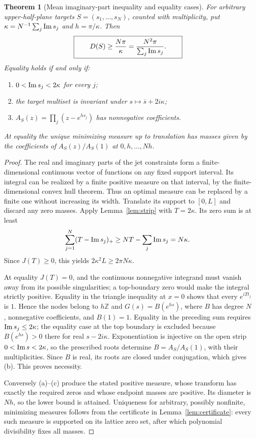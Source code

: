 \documentclass[11pt]{article}
\newtheorem{theorem}{Theorem}[section]
\theoremstyle{remark}\newtheorem{remark}[theorem]{Remark}
\begin{document}
\begin{theorem}[Mean imaginary-part inequality and equality cases]
\label{thm:global}
For arbitrary upper-half-plane targets $S=(s_1,\ldots,s_N)$, counted with
multiplicity, put $\kappa=N^{-1}\sum_j\operatorname{Im} s_j$ and $h=\pi/\kappa$. Then
\begin{equation}\label{eq:global}
 \boxed{\qquad D(S)\ge \frac{N\pi}{\kappa}
       =\frac{N^2\pi}{\sum_j\operatorname{Im} s_j}.\qquad}
\end{equation}
Equality holds if and only if:
\begin{enumerate}[label=(\alph*)]
\item $0<\operatorname{Im} s_j<2\kappa$ for every $j$;
\item the target multiset is invariant under
$s\mapsto\overline{s}+2i\kappa$;
\item $A_S(z)=\prod_j(z-e^{hs_j})$ has nonnegative coefficients.
\end{enumerate}
At equality the unique minimizing measure up to translation has masses
given by the coefficients of $A_S(z)/A_S(1)$ at $0,h,\ldots,Nh$.
\end{theorem}

\begin{proof}
The real and imaginary parts of the jet constraints form a finite-dimensional
continuous vector of functions on any fixed support interval. Its integral
can be realized by a finite positive measure on that interval, by the
finite-dimensional convex hull theorem. Thus an optimal measure can be
replaced by a finite one without increasing its width. Translate its support
to $[0,L]$ and discard any zero masses. Apply Lemma~\ref{lem:strip} with
$T=2\kappa$. Its zero sum is at least
\[
 \sum_{j=1}^N(T-\operatorname{Im} s_j)_+
 \ge NT-\sum_j\operatorname{Im} s_j=N\kappa.
\]
Since $J(T)\ge0$, this yields $2\kappa^2L\ge2\pi N\kappa$.

At equality $J(T)=0$, and the continuous nonnegative integrand must vanish
away from its possible singularities; a top-boundary zero would make the
integral strictly positive. Equality in the triangle inequality at $x=0$
shows that every $e^{iTt_j}$ is $1$. Hence the nodes belong to $h\mathbb Z$
and $G(s)=B(e^{hs})$, where $B$ has degree $N$, nonnegative coefficients,
and $B(1)=1$. Equality in the preceding sum requires $\operatorname{Im} s_j\le2\kappa$;
the equality case at the top boundary is excluded because $B(e^{hs})>0$
there for real $s-2i\kappa$. Exponentiation is injective on the open strip
$0<\operatorname{Im} s<2\kappa$, so the prescribed roots determine $B=A_S/A_S(1)$,
with their multiplicities. Since $B$ is real, its roots are closed under
conjugation, which gives (b). This proves necessity.

Conversely (a)--(c) produce the stated positive measure, whose transform
has exactly the required zeros and whose endpoint masses are positive.
Its diameter is $Nh$, so the lower bound is attained. Uniqueness for
arbitrary, possibly nonfinite, minimizing measures follows from the
certificate in Lemma~\ref{lem:certificate}: every such measure is supported
on its lattice zero set, after which polynomial divisibility fixes all
masses.
\end{proof}
\end{document}
